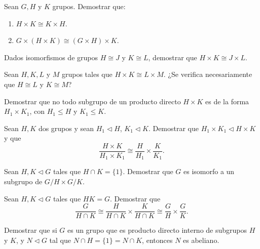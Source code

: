 \begin{ejercicio}
    Sean $G,H$ y $K$ grupos. Demostrar que:
    \begin{enumerate}
        \item $H\times K\cong K\times H$.
        \item $G\times (H\times K)\cong (G\times H)\times K$.
    \end{enumerate}
\end{ejercicio}

\begin{ejercicio}
    Dados isomorfismos de grupos $H\cong J$ y $K\cong L$, demostrar que $H\times K\cong J\times L$.
\end{ejercicio}

\begin{ejercicio}
    Sean $H,K,L$ y $M$ grupos tales que $H\times K\cong L\times M$. ¿Se verifica necesariamente que $H\cong L$ y $K\cong M$?
\end{ejercicio}

\begin{ejercicio}
    Demostrar que no todo subgrupo de un producto directo $H\times K$ es de la forma $H_1\times K_1$, con $H_1\leq H$ y $K_1\leq K$.
\end{ejercicio}

\begin{ejercicio}
    Sean $H,K$ dos grupos y sean $H_1\lhd H$, $K_1\lhd K$. Demostrar que $H_1\times K_1\lhd H\times K$ y que
    \[
        \frac{H\times K}{H_1\times K_1}\cong \frac{H}{H_1}\times \frac{K}{K_1}.
    \]
\end{ejercicio}

\begin{ejercicio}
    Sean $H,K\lhd G$ tales que $H\cap K=\{1\}$. Demostrar que $G$ es isomorfo a un subgrupo de $G/H\times G/K$.
\end{ejercicio}

\begin{ejercicio}
    Sean $H,K\lhd G$ tales que $HK=G$. Demostrar que
    \[
        \frac{G}{H\cap K}\cong \frac{H}{H\cap K}\times \frac{K}{H\cap K}\cong \frac{G}{H}\times \frac{G}{K}.
    \]
\end{ejercicio}

\begin{ejercicio}
    Demostrar que si $G$ es un grupo que es producto directo interno de subgrupos $H$ y $K$, y $N\lhd G$ tal que $N\cap H=\{1\}=N\cap K$, entonces $N$ es abeliano.
\end{ejercicio}

